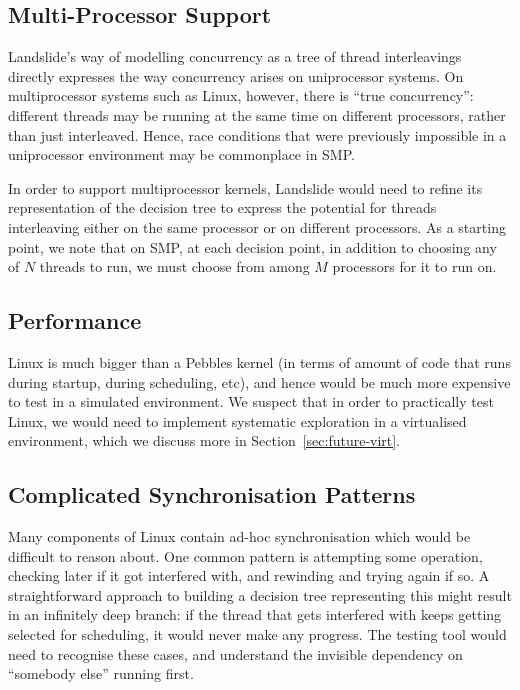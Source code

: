\subsection{Multi-Processor Support}

Landslide's way of modelling concurrency as a tree of thread interleavings directly expresses the way concurrency arises on uniprocessor systems. On multiprocessor systems such as Linux, however, there is ``true concurrency'': different threads may be running at the same time on different processors, rather than just interleaved. Hence, race conditions that were previously impossible in a uniprocessor environment may be commonplace in SMP.

In order to support multiprocessor kernels, Landslide would need to refine its representation of the decision tree to express the potential for threads interleaving either on the same processor or on different processors. As a starting point, we note that on SMP, at each decision point, in addition to choosing any of $N$ threads to run, we must choose from among $M$ processors for it to run on.

\subsection{Performance}

Linux is much bigger than a Pebbles kernel (in terms of amount of code that runs during startup, during scheduling, etc), and hence would be much more expensive to test in a simulated environment. We suspect that in order to practically test Linux, we would need to implement systematic exploration in a virtualised environment, which we discuss more in Section~\ref{sec:future-virt}.

\subsection{Complicated Synchronisation Patterns}

Many components of Linux contain ad-hoc synchronisation which would be difficult to reason about. One common pattern is attempting some operation, checking later if it got interfered with, and rewinding and trying again if so. A straightforward approach to building a decision tree representing this might result in an infinitely deep branch: if the thread that gets interfered with keeps getting selected for scheduling, it would never make any progress. The testing tool would need to recognise these cases, and understand the invisible dependency on ``somebody else'' running first.

